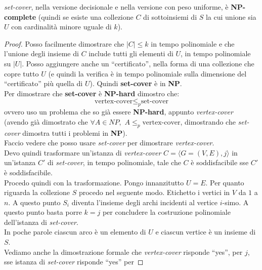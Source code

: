 										\begin{definizione}
											\textit{set-cover}, nella versione decisionale e nella
											versione con peso uniforme, è \textbf{NP-complete} (quindi se esiste una
											collezione $C$ di sottoinsiemi di $S$ 
											la cui unione sia $U$ con cardinalità minore uguale di $k$).
										\end{definizione}
										\begin{proof}
											Posso facilmente dimostrare che $|C|\leq k$ in tempo polinomiale e che
											l'unione degli insieme di $C$ include tutti gli elementi di $U$, in
											tempo polinomiale su $|U|$. Posso aggiungere anche un ``certificato'', nella
											forma di una collezione che copre tutto $U$ (e quindi la verifica è in tempo
											polinomiale sulla dimensione del ``certificato'' più quella di $U$). Quindi
											\textbf{set-cover} è in \textbf{NP}.\\
											Per dimostrare che \textbf{set-cover} è \textbf{NP-hard} dimostro che:
											\[\mbox{vertex-cover} \leq_p \mbox{set-cover}\]
											ovvero uso un problema che so già essere \textbf{NP-hard}, appunto
											\textit{vertex-cover} (avendo già dimostrato che $\forall A\in NP, \,\,A\leq_p
											\mbox{vertex-cover}$, dimostrando che \textit{set-cover} dimostra tutti i
											problemi in \textbf{NP}).\\
											Faccio vedere che posso usare \textit{set-cover} per dimostrare
											\textit{vertex-cover}.\\
											Devo quindi trasformare un'istanza di \textit{vertex-cover} $C=\langle
											G=(V,E), j\rangle$ in un'istanza $C'$ di \textit{set-cover}, in tempo
											polinomiale, tale che $C$ è soddisfacibile sse $C'$ è soddisfacibile.\\
											Procedo quindi con la trasformazione. Pongo innanzitutto $U=E$. Per quanto
											riguarda la collezione $S$ procedo nel seguente modo. Etichetto i vertici in
											$V$ da $1$ a $n$. A questo punto $S_i$ diventa l'insieme degli archi incidenti
											al vertice $i$-simo. A questo punto basta porre $k=j$ per concludere la
											costruzione polinomiale dell'istanza di \textit{set-cover}.\\
											In poche parole ciascun arco è un elemento di $U$ e ciascun vertice è un
											insieme di $S$.\\
											Vediamo anche la dimostrazione formale che \textit{vertex-cover} risponde
											``yes'', per $j$, sse istanza di \textit{set-cover} risponde ``yes'' per

\end{proof}
